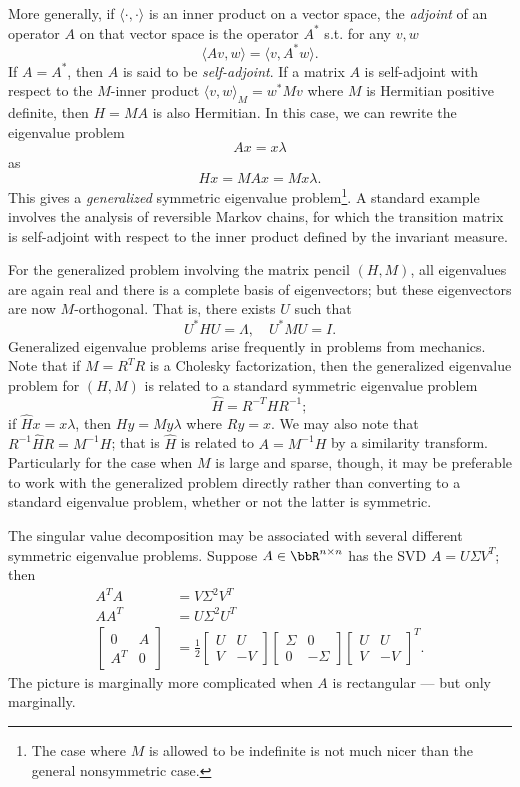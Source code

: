 More generally, if $\langle \cdot, \cdot \rangle$ is an inner product on
a vector space, the {\em adjoint} of an operator $A$ on that vector
space is the operator $A^*$ s.t. for any $v, w$
\[
  \langle Av, w \rangle = \langle v, A^* w \rangle.
\]
If $A = A^*$, then $A$ is said to be {\em self-adjoint}.
If a matrix $A$ is self-adjoint with respect to the $M$-inner product
$\langle v, w \rangle_M = w^* M v$ where $M$ is Hermitian positive
definite, then $H = M A$ is also Hermitian.  In this case, we can rewrite the
eigenvalue problem
\[
  Ax = x \lambda
\]
as
\[
  Hx = MA x = Mx \lambda.
\]
This gives a {\em generalized} symmetric eigenvalue problem\footnote{%
The case where $M$ is allowed to be indefinite is not much nicer
than the general nonsymmetric case.}.  A standard example involves
the analysis of reversible Markov chains, for which the transition
matrix is self-adjoint with respect to the inner product
defined by the invariant measure.

For the generalized problem involving the matrix pencil $(H,M)$,
all eigenvalues are again real and there is a
complete basis of eigenvectors; but these eigenvectors are now
$M$-orthogonal.  That is, there exists $U$ such that
\[
  U^* H U = \Lambda, \quad U^* M U = I.
\]
Generalized eigenvalue problems arise frequently in problems from
mechanics.  Note that if $M = R^T R$ is a Cholesky factorization,
then the generalized eigenvalue problem for $(H,M)$ is related to
a standard symmetric eigenvalue problem
\[
  \hat{H} = R^{-T} H R^{-1};
\]
if $\hat{H} x = x \lambda$, then $H y = M y \lambda$ where $Ry = x$.
We may also note that $R^{-1} \hat{H} R = M^{-1} H$; that is
$\hat{H}$ is related to $A = M^{-1} H$ by a similarity transform.
Particularly for the case when $M$ is large and sparse, though,
it may be preferable to work with the generalized problem directly
rather than converting to a standard eigenvalue problem, whether or
not the latter is symmetric.

The singular value decomposition may be associated with several
different symmetric eigenvalue problems.  Suppose $A \in \bbR^{n \times n}$
has the SVD $A = U \Sigma V^T$; then
\begin{align*}
  A^T A &= V \Sigma^2 V^T \\
  A A^T &= U \Sigma^2 U^T \\
  \begin{bmatrix}
    0 & A \\
    A^T & 0
  \end{bmatrix} &=
  \frac{1}{2}
  \begin{bmatrix}
    U & U \\
    V & -V
  \end{bmatrix}
  \begin{bmatrix}
    \Sigma & 0 \\
    0 & -\Sigma
  \end{bmatrix}
  \begin{bmatrix}
     U &  U \\
     V & -V
  \end{bmatrix}^T.
\end{align*}
The picture is marginally more complicated when $A$ is rectangular ---
but only marginally.
